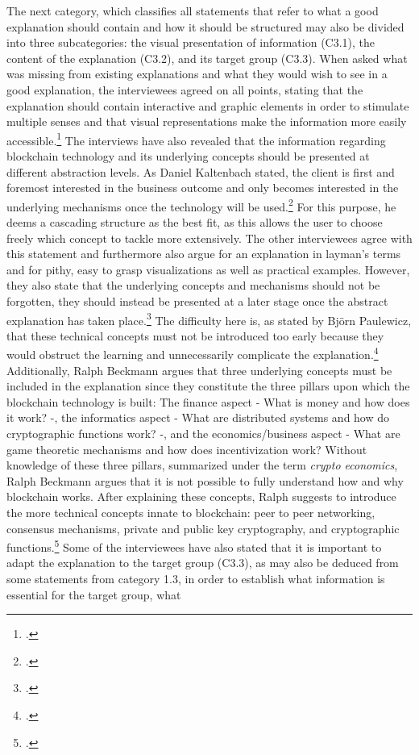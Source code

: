 The next category, which classifies all statements that refer to what a good explanation should contain and how it should be structured may also be divided into three subcategories: the visual presentation of information (C3.1), the content of the explanation (C3.2), and its target group (C3.3). When asked what was missing from existing explanations and what they would wish to see in a good explanation, the interviewees agreed on all points, stating that the explanation should contain interactive and graphic elements in order to stimulate multiple senses and that visual representations make the information more easily accessible.\footcites[Cf.][P39, P40, P42]{DanielKaltenbach_Interview}[cf.][P82, P83, P84]{BjoernPaulewicz_Interview}[cf.][P123, P124, P134]{RalphBeckmann_Interview} The interviews have also revealed that the information regarding blockchain technology and its underlying concepts should be presented at different abstraction levels. As Daniel Kaltenbach stated, the client is first and foremost interested in the business outcome and only becomes interested in the underlying mechanisms once the technology will be used.\footcites[Cf.][P29, P30, P31, P32]{DanielKaltenbach_Interview} For this purpose, he deems a cascading structure as the best fit, as this allows the user to choose freely which concept to tackle more extensively. The other interviewees agree with this statement and furthermore also argue for an explanation in layman's terms and for pithy, easy to grasp visualizations as well as practical examples. However, they also state that the underlying concepts and mechanisms should not be forgotten, they should instead be presented at a later stage once the abstract explanation has taken place.\footcites[Cf.][P51, P52, P55, P56]{DanielKaltenbach_Interview}[cf.][P78, P85, P86]{BjoernPaulewicz_Interview}[cf.][P125, P128]{RalphBeckmann_Interview} The difficulty here is, as stated by Björn Paulewicz, that these technical concepts must not be introduced too early because they would obstruct the learning and unnecessarily complicate the explanation.\footcites[Cf.][P88, P89]{BjoernPaulewicz_Interview} Additionally, Ralph Beckmann argues that three underlying concepts must be included in the explanation since they constitute the three pillars upon which the blockchain technology is built: The finance aspect - What is money and how does it work? -, the informatics aspect -  What are distributed systems and how do cryptographic functions work? -, and the economics/business aspect - What are game theoretic mechanisms and how does incentivization work? Without knowledge of these three pillars, summarized under the term \textit{crypto economics}, Ralph Beckmann argues that it is not possible to fully understand how and why blockchain works. After explaining these concepts, Ralph suggests to introduce the more technical concepts innate to blockchain: peer to peer networking, consensus mechanisms, private and public key cryptography, and cryptographic functions.\footcites[Cf.][P126, P132]{RalphBeckmann_Interview} Some of the interviewees have also stated that it is important to adapt the explanation to the target group (C3.3), as may also be deduced from some statements from category 1.3, in order to establish what information is essential for the target group, what 